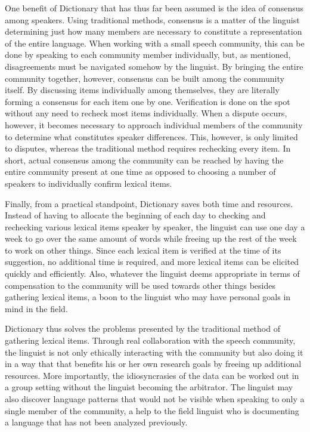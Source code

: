 \documentclass[output=paper,
modfonts
]{langscibook}
\begin{document}
One  benefit of Dictionary  that has thus far been assumed is the idea of consensus among speakers. Using traditional methods, consensus is a matter of the linguist determining just how many members are necessary to constitute a representation of the entire language. When working with a small speech community, this can be done by speaking to each community member individually, but, as mentioned, disagreements must be navigated somehow by the linguist. By bringing the entire community together, however, consensus can be built among the community itself. By discussing items individually among themselves, they are literally forming a consensus for each item one by one. Verification is done on the spot without any need to recheck most items individually. When a  dispute occurs, however, it becomes necessary to approach individual members of the community to determine what constitutes speaker differences. This, however, is only limited to  disputes, whereas the traditional method requires rechecking every item. In short, actual consensus among the community can be reached by having the entire community present at one time as opposed to choosing a number of speakers to individually confirm lexical items. 

Finally, from a practical standpoint, Dictionary  saves both time and resources. Instead of having to allocate the beginning of each day to checking and rechecking various lexical items speaker by speaker, the linguist can use one day a week to go over the same amount of words while freeing up the rest of the week to work on other things. Since each lexical item is verified at the time of its suggestion, no additional time is required, and more lexical items can be elicited quickly and efficiently. Also, whatever the linguist deems appropriate in terms of compensation to the community will be used towards other things besides gathering lexical items, a boon to the linguist who may have personal goals in mind in the field. 

Dictionary  thus solves the problems presented by the traditional method of gathering lexical items. Through real collaboration with the speech community, the linguist is not only ethically interacting with the community but also doing it in a way that that benefits his or her own research goals by freeing up additional resources. More importantly, the idiosyncrasies of the data can be worked out in a group setting without the linguist becoming the arbitrator. The linguist may also discover language patterns that would not be visible when speaking to only a single member of the community, a help to the field linguist who is documenting a language that has not been analyzed previously. 
\end{document}
